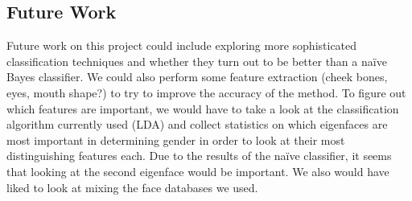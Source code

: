 \documentclass[hidelinks,11pt]{article}
\begin{document}
\subsection{Future Work}
\label{sec:conclusion:future}

Future work on this project could include exploring more sophisticated
classification techniques and whether they turn out to be better than a na\"ive
Bayes classifier. We could also perform some feature extraction (cheek bones,
eyes, mouth shape?) to try to improve the accuracy of the method. To figure out
which features are important, we would have to take a look at the classification
algorithm currently used (LDA) and collect statistics on which eigenfaces are
most important in determining gender in order to look at their most
distinguishing features each. Due to the results of the na\"ive classifier, it
seems that looking at the second eigenface would be important. 
We also would have liked to look at mixing the face databases we used.
\end{document}
